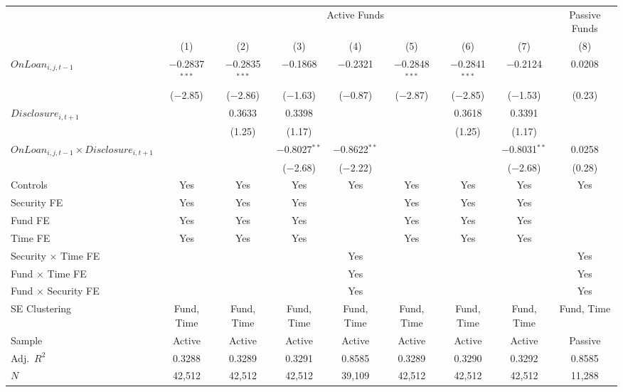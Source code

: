 {\small
\begin{tabular}{l*{8}{c}}
\toprule
 & \multicolumn{7}{c}{Active Funds} & Passive Funds \\
\cmidrule(lr){2-8} \cmidrule(lr){9-9}
 & (1) & (2) & (3) & (4) & (5) & (6) & (7) & (8) \\
\midrule
$\mathit{OnLoan}_{i,j,t-1}$ & $-$0.2837$^{***}$ & $-$0.2835$^{***}$ & $-$0.1868 & $-$0.2321 & $-$0.2848$^{***}$ & $-$0.2841$^{***}$ & $-$0.2124 & 0.0208 \\
 & ($-$2.85) & ($-$2.86) & ($-$1.63) & ($-$0.87) & ($-$2.87) & ($-$2.85) & ($-$1.53) & (0.23) \\[0.3em]
$\mathit{Disclosure}_{i,t+1}$ & & 0.3633 & 0.3398 & & & 0.3618 & 0.3391 & \\
 & & (1.25) & (1.17) & & & (1.25) & (1.17) & \\[0.3em]
$\mathit{OnLoan}_{i,j,t-1} \times \mathit{Disclosure}_{i,t+1}$ & & & $-$0.8027$^{**}$ & $-$0.8622$^{**}$ & & & $-$0.8031$^{**}$ & 0.0258 \\
 & & & ($-$2.68) & ($-$2.22) & & & ($-$2.68) & (0.28) \\
\midrule
Controls & Yes & Yes & Yes & Yes & Yes & Yes & Yes & Yes \\
\midrule
Security FE & Yes & Yes & Yes & & Yes & Yes & Yes & \\
Fund FE & Yes & Yes & Yes & & Yes & Yes & Yes & \\
Time FE & Yes & Yes & Yes & & Yes & Yes & Yes & \\
Security $\times$ Time FE & & & & Yes & & & & Yes \\
Fund $\times$ Time FE & & & & Yes & & & & Yes \\
Fund $\times$ Security FE & & & & Yes & & & & Yes \\
\midrule
SE Clustering & Fund, Time & Fund, Time & Fund, Time & Fund, Time & Fund, Time & Fund, Time & Fund, Time & Fund, Time \\
Sample & Active & Active & Active & Active & Active & Active & Active & Passive \\
Adj.\ $R^2$ & 0.3288 & 0.3289 & 0.3291 & 0.8585 & 0.3289 & 0.3290 & 0.3292 & 0.8585 \\
$N$ & 42,512 & 42,512 & 42,512 & 39,109 & 42,512 & 42,512 & 42,512 & 11,288 \\
\bottomrule
\end{tabular}
}

